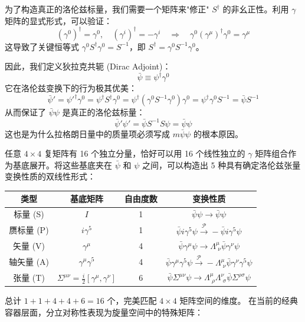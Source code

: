 为了构造真正的洛伦兹标量，我们需要一个矩阵来"修正" $S^\dagger$ 的非幺正性。利用 $\gamma$ 矩阵的显式形式，可以验证：
\begin{equation}
    (\gamma^0)^\dagger = \gamma^0, \quad (\gamma^i)^\dagger = -\gamma^i \quad \Longrightarrow \quad \gamma^0 (\gamma^\mu)^\dagger \gamma^0 = \gamma^\mu
\end{equation}
这导致了关键恒等式 $\gamma^0 S^\dagger \gamma^0 = S^{-1}$，即 $S^\dagger = \gamma^0 S^{-1} \gamma^0$。

因此，我们定义狄拉克共轭 (Dirac Adjoint)：
\begin{equation}
    \bar{\psi} \equiv \psi^\dagger \gamma^0
\end{equation}
它在洛伦兹变换下的行为极其优美：
\begin{equation}
    \bar{\psi}' = \psi'^\dagger \gamma^0 = \psi^\dagger S^\dagger \gamma^0 = \psi^\dagger (\gamma^0 S^{-1} \gamma^0) \gamma^0 = \psi^\dagger \gamma^0 S^{-1} = \bar{\psi} S^{-1}
\end{equation}
从而保证了 $\bar{\psi}\psi$ 是真正的洛伦兹标量：
\begin{equation}
    \bar{\psi}'\psi' = \bar{\psi} S^{-1} S \psi = \bar{\psi}\psi
\end{equation}
这也是为什么拉格朗日量中的质量项必须写成 $m\bar{\psi}\psi$ 的根本原因。
\vspace{2ex}\par 
任意 $4 \times 4$ 复矩阵有 16 个独立分量，恰好可以用 16 个线性独立的 $\gamma$ 矩阵组合作为基底展开。将这些基底夹在 $\bar{\psi}$ 和 $\psi$ 之间，可以构造出 5 种具有确定洛伦兹张量变换性质的双线性形式：

\begin{center}
\begin{tabular}{|c|c|c|c|}
\hline
\textbf{类型} & \textbf{基底矩阵} & \textbf{自由度数} & \textbf{变换性质} \\
\hline
标量 (S) & $I$ & 1 & $\bar{\psi}\psi \to \bar{\psi}\psi$ \\
\hline
赝标量 (P) & $i\gamma^5$ & 1 & $\bar{\psi}i\gamma^5\psi \xrightarrow{\mathcal{P}} -\bar{\psi}i\gamma^5\psi$ \\
\hline
矢量 (V) & $\gamma^\mu$ & 4 & $\bar{\psi}\gamma^\mu\psi \to \Lambda^\mu_{\,\,\nu}\bar{\psi}\gamma^\nu\psi$ \\
\hline
轴矢量 (A) & $\gamma^\mu\gamma^5$ & 4 & $\bar{\psi}\gamma^\mu\gamma^5\psi \xrightarrow{\mathcal{P}} -\Lambda^\mu_{\,\,\nu}\bar{\psi}\gamma^\nu\gamma^5\psi$ \\
\hline
张量 (T) & $\Sigma^{\mu\nu} = \frac{i}{2}[\gamma^\mu,\gamma^\nu]$ & 6 & $\bar{\psi}\Sigma^{\mu\nu}\psi \to \Lambda^\mu_{\,\,\rho}\Lambda^\nu_{\,\,\sigma}\bar{\psi}\Sigma^{\rho\sigma}\psi$ \\
\hline
\end{tabular}
\end{center}
总计 $1 + 1 + 4 + 4 + 6 = 16$ 个，完美匹配 $4 \times 4$ 矩阵空间的维度。
在当前的经典容器层面，分立对称性表现为旋量空间中的特殊矩阵：

